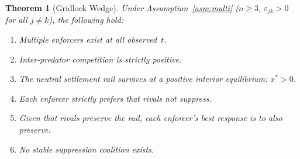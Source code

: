 \documentclass[12pt]{article}
\newtheorem{theorem}{Theorem}
\theoremstyle{definition}
\theoremstyle{remark}
\begin{document}
\begin{theorem}[Gridlock Wedge]\label{thm:gridlock}
Under Assumption~\ref{asm:multi} ($n \geq 3$,
$\varepsilon_{jk} > 0$ for all $j \neq k$), the following hold:
\begin{enumerate}[label=\textup{(G\arabic*)}]
  \item\label{G1} Multiple enforcers exist at all observed~$t$.
  \item\label{G2} Inter-predator competition is strictly positive.
  \item\label{G3} The neutral settlement rail survives at a positive
    interior equilibrium: $x^{*} > 0$.
  \item\label{G4} Each enforcer strictly prefers that rivals not
    suppress.
  \item\label{G5} Given that rivals preserve the rail, each enforcer's
    best response is to also preserve.
  \item\label{G6} No stable suppression coalition exists.
\end{enumerate}
\end{theorem}
\end{document}
